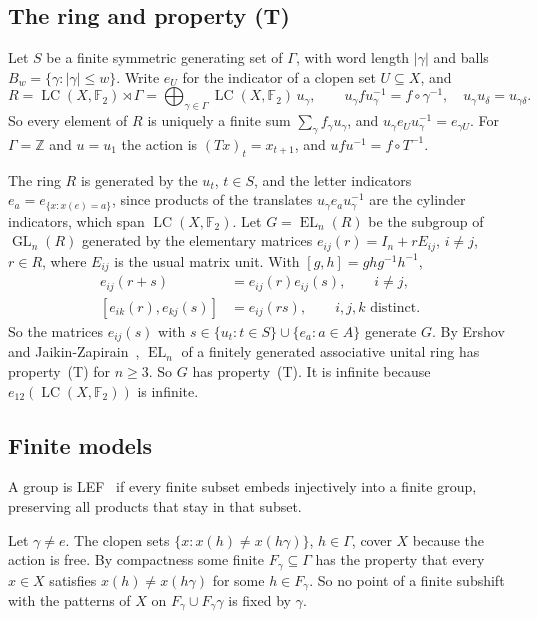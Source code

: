 \documentclass[11pt]{amsart}
\newcommand{\F}{\mathbb F}
\newcommand{\Z}{\mathbb Z}
\newcommand{\LC}{\operatorname{LC}}
\newcommand{\EL}{\operatorname{EL}}
\newcommand{\GL}{\operatorname{GL}}
\begin{document}
\subsection*{The ring and property (T)}
Let $S$ be a finite symmetric generating set of $\Gamma$, with word length
$|\gamma|$ and balls $B_w=\{\gamma:|\gamma|\le w\}$. Write $e_U$ for the
indicator of a clopen set $U\subseteq X$, and
\[
 R=\LC(X,\F_2)\rtimes\Gamma=\bigoplus_{\gamma\in\Gamma}\LC(X,\F_2)\,u_\gamma,
 \qquad u_\gamma fu_\gamma^{-1}=f\circ\gamma^{-1},\quad
 u_\gamma u_\delta=u_{\gamma\delta}.
\]
So every element of $R$ is uniquely a finite sum
$\sum_\gamma f_\gamma u_\gamma$, and $u_\gamma e_Uu_\gamma^{-1}=e_{\gamma U}$.
For $\Gamma=\Z$ and $u=u_1$ the action is $(Tx)_t=x_{t+1}$, and
$ufu^{-1}=f\circ T^{-1}$.

The ring $R$ is generated by the $u_t$, $t\in S$, and the letter
indicators $e_a=e_{\{x:x(e)=a\}}$, since products of the translates
$u_\gamma e_au_\gamma^{-1}$ are the cylinder indicators, which span
$\LC(X,\F_2)$. Let $G=\EL_n(R)$ be the subgroup of $\GL_n(R)$ generated by
the elementary matrices $e_{ij}(r)=I_n+rE_{ij}$, $i\ne j$, $r\in R$, where
$E_{ij}$ is the usual matrix unit. With $[g,h]=ghg^{-1}h^{-1}$,
\begin{equation}\label{eq:elementary}
 \begin{aligned}
 e_{ij}(r+s)&=e_{ij}(r)e_{ij}(s),\qquad i\ne j,\\
 [e_{ik}(r),e_{kj}(s)]&=e_{ij}(rs),\qquad i,j,k\text{ distinct}.
 \end{aligned}
\end{equation}
So the matrices $e_{ij}(s)$ with $s\in\{u_t:t\in S\}\cup\{e_a:a\in A\}$
generate $G$. By Ershov and Jaikin-Zapirain~\cite[Theorem~1.1]{EJZ},
$\EL_n$ of a finitely generated associative unital ring has
property~\textup{(T)} for $n\ge3$. So $G$ has property~\textup{(T)}. It is
infinite because $e_{12}(\LC(X,\F_2))$ is infinite.

\subsection*{Finite models}
A group is LEF~\cite{VershikGordon} if every finite subset embeds
injectively into a finite group, preserving all products that stay in
that subset.

Let $\gamma\ne e$. The clopen sets $\{x:x(h)\ne x(h\gamma)\}$, $h\in\Gamma$,
cover $X$ because the action is free. By compactness some finite
$F_\gamma\subseteq\Gamma$ has the property that every $x\in X$ satisfies
$x(h)\ne x(h\gamma)$ for some $h\in F_\gamma$. So no point of a finite
subshift with the patterns of $X$ on $F_\gamma\cup F_\gamma\gamma$ is fixed
by $\gamma$.
\end{document}

